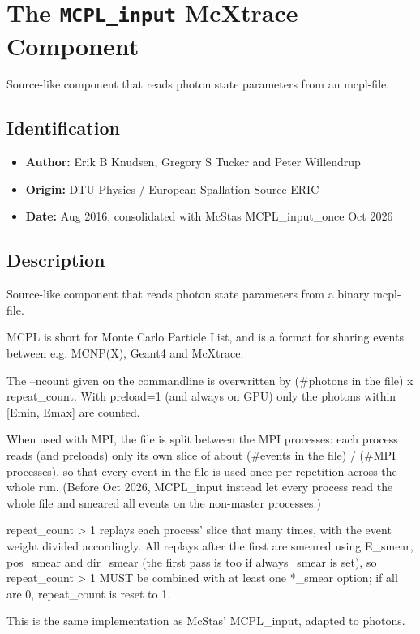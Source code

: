 \section{The \texttt{MCPL\_input} McXtrace Component}
Source-like component that reads photon state parameters from an mcpl-file.

\subsection*{Identification}
\begin{itemize}
  \item \textbf{Author:} Erik B Knudsen, Gregory S Tucker and Peter Willendrup
  \item \textbf{Origin:} DTU Physics / European Spallation Source ERIC
  \item \textbf{Date:} Aug 2016, consolidated with McStas MCPL\_input\_once Oct 2026
\end{itemize}

\subsection*{Description}
Source-like component that reads photon state parameters from a binary mcpl-file.

MCPL is short for Monte Carlo Particle List, and is a format for sharing events between e.g. MCNP(X), Geant4 and McXtrace.

The --ncount given on the commandline is overwritten by (\#photons in the file) x repeat\_count. With preload=1 (and always on GPU) only the photons within [Emin, Emax] are counted.

When used with MPI, the file is split between the MPI processes: each process reads (and preloads) only its own slice of about (\#events in the file) / (\#MPI processes), so that every event in the file is used once per repetition across the whole run. (Before Oct 2026, MCPL\_input instead let every process read the whole file and smeared all events on the non-master processes.)

repeat\_count \textgreater{} 1 replays each process' slice that many times, with the event weight divided accordingly. All replays after the first are smeared using E\_smear, pos\_smear and dir\_smear (the first pass is too if always\_smear is set), so repeat\_count \textgreater{} 1 MUST be combined with at least one *\_smear option; if all are 0, repeat\_count is reset to 1.

This is the same implementation as McStas' MCPL\_input, adapted to photons.

